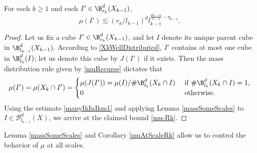 \begin{corollary}\label{muAtScaleRk}
For each $k\geq 1$ and each $I' \in \B^d_{r_k} (X_{k-1})$, 
	\begin{equation} 
	\mu(I') \lesssim (r_k/l_{k-1})^d l_{k-1}^{\frac{dn-\alpha}{n-1}-\eta_{k-1}}. \label{mu-Rk}
	\end{equation} 
\end{corollary}
\begin{proof}
Let us fix a cube $I' \in \B^d_{r_k}(X_{k-1})$, and let $I$ denote its unique parent cube in $\B_{l_{k-1}}^d (X_{k-1})$. According to \eqref{XkWellDistributed}, $I'$ contains at most one cube in $\B_{l_k}^d(I)$; let us denote this cube by $J(I')$ if it exists. Then the mass distribution rule given by \eqref{muRecurse} dictates that 
\begin{align*}
\mu(I') = \mu(X_k \cap I') = \begin{cases} \mu(J(I')) = {\mu(I)}/{\# \B_{l_k}^d(X_k \cap I)}  &\text{ if } \# \B_{l_k}^d(X_k \cap I) = 1, \\ 0 &\text{ otherwise.} \end{cases} 
\end{align*} 
Using the estimate \eqref{manyIkInIkm1} and applying Lemma \ref{massSomeScales} to $I \in \mathcal B_{l_{k-1}}^d(X)$, we arrive at the claimed bound \eqref{mu-Rk}. 
\end{proof}
Lemma \ref{massSomeScales} and Corollary \ref{muAtScaleRk} allow us to control the behavior of $\mu$ at all scales. %

